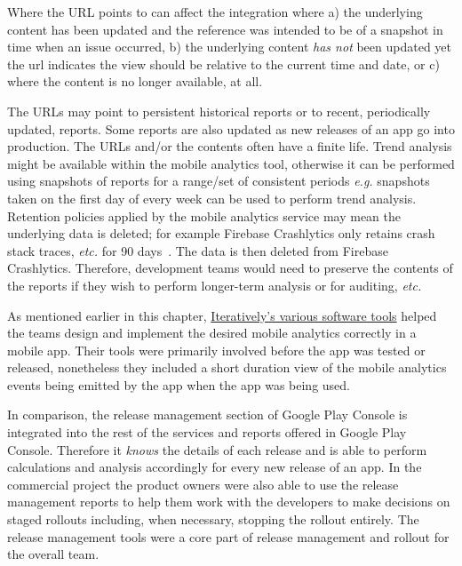 Where the URL points to can affect the integration where a) the underlying content has been updated and the reference was intended to be of a snapshot in time when an issue occurred, b) the underlying content \emph{has not} been updated yet the url indicates the view should be relative to the current time and date, or c) where the content is no longer available, at all.

The URLs may point to persistent historical reports or to recent, periodically updated, reports. Some reports are also updated as new releases of an app go into production. The URLs and/or the contents often have a finite life. Trend analysis might be available within the mobile analytics tool, otherwise it can be performed using snapshots of reports for a range/set of consistent periods \emph{e.g.} snapshots taken on the first day of every week can be used to perform trend analysis. Retention policies applied by the mobile analytics service may mean the underlying data is deleted; for example Firebase Crashlytics only retains crash stack traces, \emph{etc.} for 90 days~. The data is then deleted from Firebase Crashlytics. Therefore, development teams would need to preserve the contents of the reports if they wish to perform longer-term analysis or for auditing, \emph{etc.}


As mentioned earlier in this chapter, \hyperlink{tata-design-of-mobile-analytics-events-and-content}{Iteratively's various software tools}  helped the teams design and implement the desired mobile analytics correctly in a mobile app. Their tools were primarily involved before the app was tested or released, nonetheless they included a short duration view of the mobile analytics events being emitted by the app when the app was being used.

In comparison, the release management section of Google Play Console is integrated into the rest of the services and reports offered in Google Play Console. Therefore it \emph{knows} the details of each release and is able to perform calculations and analysis accordingly for every new release of an app. In the commercial project the product owners were also able to use the release management reports to help them work with the developers to make decisions on staged rollouts including, when necessary, stopping the rollout entirely. The release management tools were a core part of release management and rollout for the overall team. %

